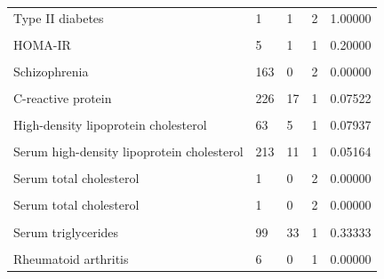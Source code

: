 \documentclass[11pt,oneside]{bristolthesis}
\begin{document}
\begin{table}
{\begin{tabular}[t]{lllll}
Type II diabetes & 1 & 1 & 2 & 1.00000\\
\cellcolor{gray!6}{HOMA-IR} & \cellcolor{gray!6}{1} & \cellcolor{gray!6}{1} & \cellcolor{gray!6}{1} & \cellcolor{gray!6}{1.00000}\\
HOMA-IR & 5 & 1 & 1 & 0.20000\\
\addlinespace
\cellcolor{gray!6}{Schizophrenia} & \cellcolor{gray!6}{3} & \cellcolor{gray!6}{0} & \cellcolor{gray!6}{2} & \cellcolor{gray!6}{0.00000}\\
Schizophrenia & 163 & 0 & 2 & 0.00000\\
\cellcolor{gray!6}{C-reactive protein} & \cellcolor{gray!6}{3} & \cellcolor{gray!6}{3} & \cellcolor{gray!6}{1} & \cellcolor{gray!6}{1.00000}\\
C-reactive protein & 226 & 17 & 1 & 0.07522\\
\cellcolor{gray!6}{High-density lipoprotein cholesterol} & \cellcolor{gray!6}{2} & \cellcolor{gray!6}{2} & \cellcolor{gray!6}{1} & \cellcolor{gray!6}{1.00000}\\
\addlinespace
High-density lipoprotein cholesterol & 63 & 5 & 1 & 0.07937\\
\cellcolor{gray!6}{Serum high-density lipoprotein cholesterol} & \cellcolor{gray!6}{22} & \cellcolor{gray!6}{17} & \cellcolor{gray!6}{1} & \cellcolor{gray!6}{0.77273}\\
Serum high-density lipoprotein cholesterol & 213 & 11 & 1 & 0.05164\\
\cellcolor{gray!6}{Serum low-density lipoprotein cholesterol} & \cellcolor{gray!6}{61} & \cellcolor{gray!6}{0} & \cellcolor{gray!6}{1} & \cellcolor{gray!6}{0.00000}\\
Serum total cholesterol & 1 & 0 & 2 & \vphantom{1}0.00000\\
\addlinespace
\cellcolor{gray!6}{Serum total cholesterol} & \cellcolor{gray!6}{111} & \cellcolor{gray!6}{0} & \cellcolor{gray!6}{2} & \cellcolor{gray!6}{0.00000}\\
Serum total cholesterol & 1 & 0 & 2 & 0.00000\\
\cellcolor{gray!6}{Serum triglycerides} & \cellcolor{gray!6}{46} & \cellcolor{gray!6}{38} & \cellcolor{gray!6}{1} & \cellcolor{gray!6}{0.82609}\\
Serum triglycerides & 99 & 33 & 1 & 0.33333\\
\cellcolor{gray!6}{Rheumatoid arthritis} & \cellcolor{gray!6}{47,875} & \cellcolor{gray!6}{8} & \cellcolor{gray!6}{1} & \cellcolor{gray!6}{0.00017}\\
\addlinespace
Rheumatoid arthritis & 6 & 0 & 1 & 0.00000\\

\end{tabular}}
\end{table}
\end{document}
